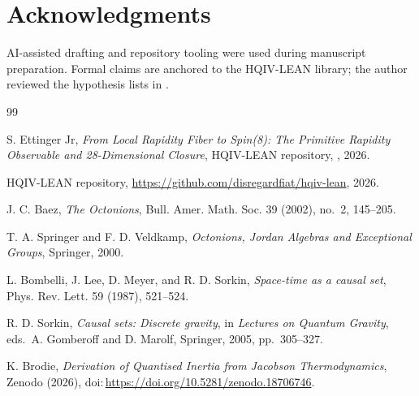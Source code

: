 \documentclass[11pt]{amsart}
\begin{document}
\section*{Acknowledgments}
AI-assisted drafting and repository tooling were used during manuscript preparation. Formal claims are anchored to the HQIV-LEAN library; the author reviewed the hypothesis lists in .

\begin{thebibliography}{99}

S. Ettinger Jr, \emph{From Local Rapidity Fiber to Spin(8): The Primitive Rapidity Observable and 28-Dimensional Closure}, HQIV-LEAN repository, , 2026.

HQIV-LEAN repository, \url{https://github.com/disregardfiat/hqiv-lean}, 2026.

J. C. Baez, \emph{The Octonions}, Bull. Amer. Math. Soc. 39 (2002), no.~2, 145--205.

T. A. Springer and F. D. Veldkamp, \emph{Octonions, Jordan Algebras and Exceptional Groups}, Springer, 2000.

L. Bombelli, J. Lee, D. Meyer, and R. D. Sorkin, \emph{Space-time as a causal set}, Phys. Rev. Lett. 59 (1987), 521--524.

R. D. Sorkin, \emph{Causal sets: Discrete gravity}, in \emph{Lectures on Quantum Gravity}, eds.\ A. Gomberoff and D. Marolf, Springer, 2005, pp.~305--327.

K. Brodie, \emph{Derivation of Quantised Inertia from Jacobson Thermodynamics}, Zenodo (2026), doi:\,\url{https://doi.org/10.5281/zenodo.18706746}.

\end{thebibliography}
\end{document}
